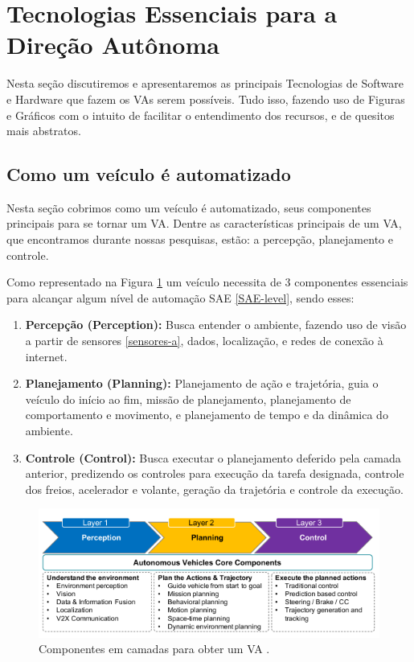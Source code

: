 \section{Tecnologias Essenciais para a Direção Autônoma} \label{essencias_di}

Nesta seção discutiremos e apresentaremos as principais Tecnologias de Software e Hardware que fazem os VAs serem possíveis. Tudo isso, fazendo uso de Figuras e Gráficos com o intuito de facilitar o entendimento dos recursos, e de quesitos mais abstratos. 


\subsection{Como um veículo é automatizado}
Nesta seção cobrimos como um veículo é automatizado, seus componentes principais para se tornar um VA. Dentre as características principais de um VA, que encontramos durante nossas pesquisas, estão: a percepção, planejamento e controle.

Como representado na Figura \ref{figura_perception} um veículo necessita de 3 componentes essenciais para alcançar algum nível de automação SAE \ref{SAE-level}, sendo esses:


\begin{enumerate}
 \item \textbf{Percepção (Perception):} Busca entender o ambiente, fazendo uso de visão a partir de sensores \ref{sensores-a}, dados, localização, e redes de conexão à internet.
\item \textbf{Planejamento (Planning):} Planejamento de ação e trajetória, guia o veículo do início ao fim, missão de planejamento, planejamento de comportamento e movimento, e planejamento de tempo e da dinâmica do ambiente.
\item \textbf{Controle (Control):} Busca executar o planejamento deferido pela camada anterior, predizendo os controles para execução da tarefa designada, controle dos freios, acelerador e volante, geração da trajetória e controle da execução.

\end{enumerate}

\begin{figure}[H]
\centering
\includegraphics[width=\textwidth]{Figures/perception.png}
\caption{Componentes em camadas para obter um VA \cite{sensors-yet}.}
\label{figura_perception}
\end{figure}

